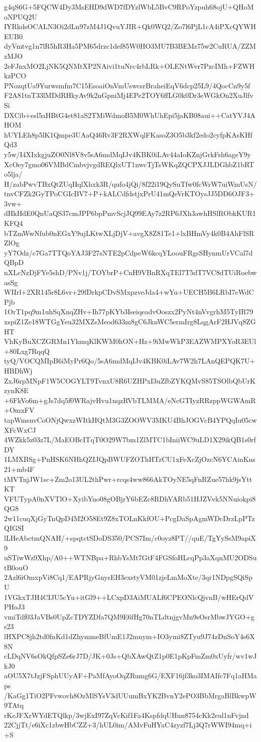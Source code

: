 g4qS6G+5FQCW4Dy3MsEHD9dWD7fDYzlWbL5BvC9RPoYzpuh68ojU+QHoMoNPUQ2U
IYRkdsOCALN3Oi2dLn97zM4J1QvuYJIR+Qk0WQ2/Zo7l6PjL1cA4iPXcQYWHEUB0
dyVmtvg1n7lR5hR3Ha5PM65drzc1def85W0HO3MU7B3BEMz75w2CuRUA/ZZMzMJO
2eFJnxMO2LjNK5QNMtXP2NAivi1tuNrc4rbLRk+OLENtWvr7PzcIMh+FZWHkzPCO
PNozqtUa9Yurwsmfm7C15EsoaiOnVmUswcsrBraheiEqV6dcp25L9/4QocCn9y5f
F2A81tnT33lMDdRHkyAv9k2nGpniMj4EPe2TOY6ffLG0k0Dr3eWGkOn2XuJlfvSi
DXCib+esl5aHBtG4et81aS2TMiWdmoB5M0WhUhEpi5jaKB08aui++CatYVJ4AHOM
hUYLEh8p5lK1Qmpe3UAaQ46Rv3F2RXWqlFKasoZ3O5b3kf2edo2cyfpKAsKHfQd3
y5w/I4XIxkgjuZO0Nl8V8v5sA6mdMqIJv4KBK0iLAv44aIoKZnjGrkFsh6ageY9y
XcOey7gmo06VMBdCmbvjvgdREQlxUT1nwcTjTsWKqZQCPXJJLDGhbZ1bRTo5lja/
H/zabPwvTBxQtZUqHqlXhxk3R/qufo4jQi/8f22i19QySuTfw0fcWrW7uiWmUsN/
tnvCFZk2GyTPoCGIcBV7+P+kALCdfdstjxPrU41mQeVrKTOysJJ5DD6OJF3+3vw+
dHkHdE0QnUaQS37cmJPP6bpPmvScjJQ99EAy7z2RP6JXh3awhHSlRObkKUR1KFQ4
bTZmWwNfub0nEGxY9ujLKtwXLjDjV+avgX8Z81Te1+lxBHmVy4k0B4AhFlSRZlOg
yY7Odz/c7Ga7TTQoYAJ3F27sNTE2pCdpeW6kcqYLoouFRgsSHynmUrVCal7dQBpD
nXLcNzDjFYe5shD/PNv1j/TOYbrP+CnH9VBnRXqTEl7T5dT7VC8dTUiRoebwasSg
WIIrl+2XR145r8L6vr+29fDrkpCDvSMxpzveJda4+wYu+UECH5B6LRbI7eWdCPjb
1OrT1pq9m1uhSqXnqZHv+Ih77pKYb3IseiqeadvOoszx2PyNt4nVvgrhM5TyIR79
xspiZ1Ze18WTGgYeu32MXZsMeod633m8gC6JknWC5ermIrg8LqgArF2HJVq8ZGHT
VhKyBuXCZGRMn1YkmqKlKWM0hON+Hz+9iMwWkP3EAZWMPXYoR3EUl+80Lxg7RqqQ
tyQ/VOCQMIpB6iMyPr6Qo/5sA6mdMqIJv4KBK0iLAv7W2h7LAnQEPQK7U+HBDhWj
ZxJ6rpMNpF1W5COGYLT9TvnxU8R6UZHPxI3uZfbZYKQMvS85TSOlbQbUrKzynK8E
+6FkVo6m+gJs7dq5f0WRajvHvu1nqzRVbTLMMA/eNcGTIyzRRzppWGWAmR+OmxFV
tapWmsnvCoONjQwxzWItkHQtM3G3ZOOWV3MKU4BhJOGVcB4YPQqIu05cwXFcWxCJ
4WZkk5z03z7L/MaEOBcITqT0O29W7bm1ZlMTC1bIniiWC9uLD1X29ikQB1s0rfDY
1LMXBSg+PnHSK6NHhQZIJQpBWUFZOThHTzCU1xFeXcZjOzcN6YCAinKns21+mb4F
tMVTnjJW1sc+Zm2o13UL2thPwr+rcqs4ww866AkTOyNE5qFnRZue57hk9jsYttKT
VFUTypA0nXVTlO+XyibYno08gOBjrY6bEZc8RDhVARb51HJZVvk5NNuiokpi8QG8
2w11cuqXjGyTnQpD4M2O58Et9Z8xTOLnKkfOU+PcgDaSpAgmWDcDrzLpPTzQIGSI
lLHeAbctmQNAH/+spqtctSDoDS350/PCS7Im/c0oyz8PT//quE/TgYySsM9apiX9
uSTiwWz9Xhp/A0++WTNBpa+RhbYsMt7GtF4FGSfoHLcqPp3aXqnMU2ODSutB0ouO
2Azl6iOmxpVi8Cq1/EAPRjyGnysEH3exstyVM01zjeLmMoXte/3qr1NDpgSQiSpU
1VGkxTJH4CIJU5cYu+itGl9++LCxpD3AiMUALf6CPEONlcQjvnB/wHErQdVPHoJ3
vmiTdf03JaVBs0UpZcTDYZDfa7QM9E6fHg70nTLdtnjgvMn9sOsrMbwJYGO+gs23
lHXPC8jh2td0fnKd1dZhymmeBfUmE1J2mnym+IO3ymi8ZTyu9J74zDnSoY4s6X8N
cLDqNV6sOkQfpSZe6rJ7D/JK+0Js+QbXAwQtZ1p0E1pKpFmZm0xUyfr/wv1wJkJ0
aOU5X7tJzjFSphUUyAF+PaMfAyoOqZRumg6G/EXF16jf3ko3IMAIfc7Fq1aHMaps
/KaGg1TiO2PFvwovh8OzMlSYsV3dUUumBxYK2BvnY2ePO3BbMrgaBlBkwpW9TAtq
rKcJFXrWYdETQlkp/3wjExI97ZqVcKif1Fa4KspfdqUHun8754cKk2eul1nFvjnd
22CjjTt/e6iXc1zbwHbCZZ+3/hUL0im/AMvFuHYaC4zyzf7Lj3Q7rWWI94mq+i+S
